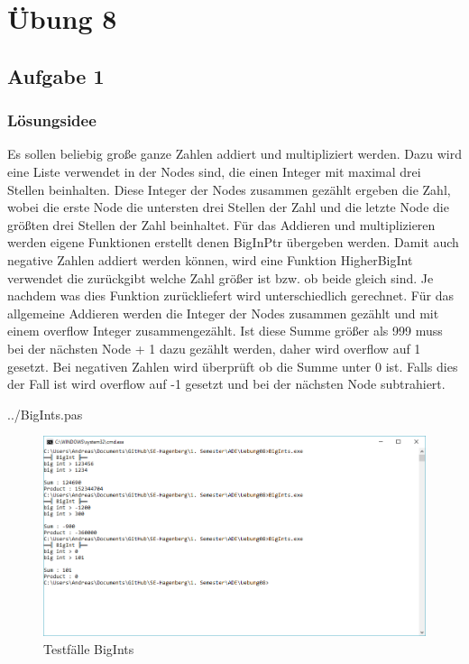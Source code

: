 \section*{Übung 8}
\subsection*{Aufgabe 1}
\subsubsection*{Lösungsidee}
Es sollen beliebig große ganze Zahlen addiert und multipliziert werden. Dazu wird eine Liste verwendet in der Nodes sind, die einen Integer mit maximal drei Stellen beinhalten. Diese Integer der Nodes zusammen gezählt ergeben die Zahl, wobei die erste Node die untersten drei Stellen der Zahl und die letzte Node die größten drei Stellen der Zahl beinhaltet. Für das Addieren und multiplizieren werden eigene Funktionen erstellt denen BigInPtr übergeben werden. Damit auch negative Zahlen addiert werden können, wird eine Funktion  HigherBigInt verwendet die zurückgibt welche Zahl größer ist bzw. ob beide gleich sind. Je nachdem was dies Funktion zurückliefert wird unterschiedlich gerechnet. Für das allgemeine Addieren werden die Integer der Nodes zusammen gezählt und mit einem overflow Integer zusammengezählt. Ist diese Summe größer als 999 muss bei der nächsten Node + 1 dazu gezählt werden, daher wird overflow auf 1 gesetzt. Bei negativen Zahlen wird überprüft ob die Summe unter 0 ist. Falls dies der Fall ist wird overflow auf -1 gesetzt und bei der nächsten Node subtrahiert.
\newline

 {../BigInts.pas}
\begin{figure}[H]
	\centering
	\includegraphics[scale=0.65]{./pictures/BigInts.png}
	\caption{Testfälle BigInts}
	\label{fig: BigInts}
\end{figure}

